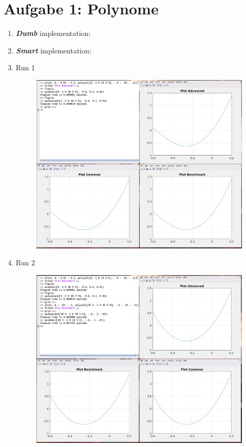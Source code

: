 \documentclass[12pt,a4paper]{article}
\begin{document}
\section*{Aufgabe 1: Polynome}
\begin{enumerate}[leftmargin=!,labelindent=5pt]
	\item \textit{\textbf{Dumb}} implementation:
		
		\newpage

	\item \textit{\textbf{Smart}} implementation:
		
		\newpage

	\item Run 1
		\begin{figure}[H]
			\centering
			\includegraphics[scale=0.45]{./img/poly_comp_01.png}\label{fig:1}
		\end{figure}

	\item Run 2
		\begin{figure}[H]
			\centering
			\includegraphics[scale=0.45]{./img/poly_comp_02.png}\label{fig:1}
		\end{figure}
		\newpage


\end{enumerate}
\end{document}
